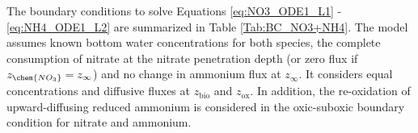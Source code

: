 \documentclass[gmd, manuscript]{copernicus}
\begin{document}
The boundary conditions to solve Equations \ref{eq:NO3_ODE1_L1} - \ref{eq:NH4_ODE1_L2} are summarized in Table \ref{Tab:BC_NO3+NH4}. The model assumes known bottom water concentrations 
for both species, the complete consumption of nitrate at the nitrate penetration depth (or zero flux if $z_{\chem{NO_3}}=z_\infty$) and no change in ammonium flux at $z_\infty$. It considers equal concentrations and diffusive fluxes 
at $z_{\mathrm{bio}}$ and $z_{\mathrm{ox}}$.  In addition, the re-oxidation of upward-diffusing reduced ammonium is considered in the oxic-suboxic boundary condition for nitrate and ammonium. 
\end{document}
